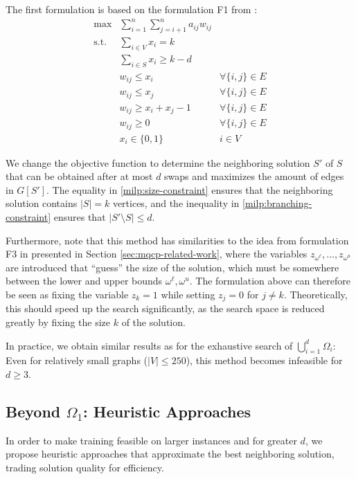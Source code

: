 \documentclass[draft,final]{vutinfth} %
\begin{document}
The first formulation is based on the formulation F1 from \cite{pattillo_maximum_2013}:  
\begin{align}
    \max & \sum_{i=1}^n \sum_{j=i+1}^n a_{ij} w_{ij}  &\\
    \text{s.t. } & \sum_{i \in V} x_i = k & \label{milp:size-constraint} \\
    & \sum_{i \in S} x_i \geq k - d  &  \label{milp:branching-constraint}\\
     & w_{ij} \leq x_i & \forall \{i, j\} \in E\\
     & w_{ij} \leq x_j & \forall \{i, j\} \in E\\
     & w_{ij} \geq x_i + x_j - 1 & \forall \{i, j\} \in E\\
    & w_{ij} \geq 0 & \forall \{i, j\} \in E \\
    & x_i \in \{0,1\} & i \in V
\end{align}

We change the objective function to determine the neighboring solution $S'$ of $S$ that can be obtained after at most $d$ swaps and maximizes the amount of edges in $G[S']$. The equality in \ref{milp:size-constraint} ensures that the neighboring solution contains $|S| = k$ vertices, and the inequality in \ref{milp:branching-constraint} ensures that $|S' \setminus S| \leq d$. 

Furthermore, note that this method has similarities to the idea from formulation F3 in \cite{VeremyevPBP16} presented in Section \ref{sec:mqcp-related-work}, where the variables $z_{\omega^\ell}, \dots, z_{\omega^u}$ are introduced that ``guess'' the size of the solution, which must be somewhere between the lower and upper bounds $\omega^\ell, \omega^u$. The formulation above can therefore be seen as fixing the variable $z_k = 1$ while setting $z_j = 0$ for $j \neq k$. Theoretically, this should speed up the search significantly, as the search space is reduced greatly by fixing the size $k$ of the solution.  

In practice, we obtain similar results as for the exhaustive search of $\bigcup_{i=1}^d \Omega_i$: Even for relatively small graphs ($|V| \leq 250$), this method becomes infeasible for $d \geq 3$. 

\subsection{Beyond $\Omega_1$: Heuristic Approaches}

In order to make training feasible on larger instances and for greater $d$, we propose heuristic approaches that approximate the best neighboring solution, trading solution quality for efficiency. 
\end{document}
